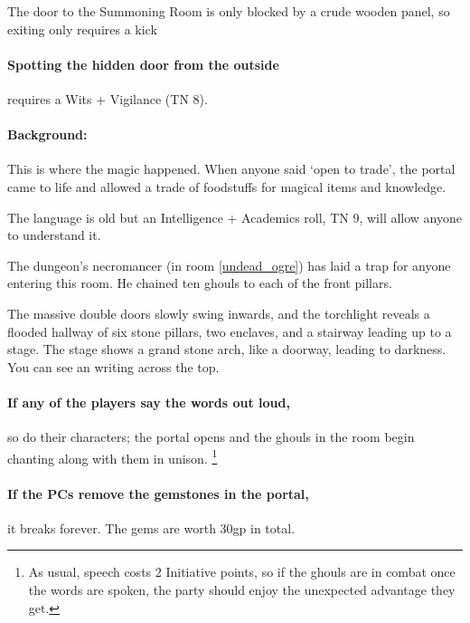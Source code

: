 \begin{multicols}{2}
The door to the Summoning Room is only blocked by a crude wooden panel, so exiting only requires a kick

\paragraph{Spotting the hidden door from the outside}
requires a Wits + Vigilance (TN 8).

\label{summoningRoom}

\paragraph{Background:}
This is where the magic happened.
When anyone said `open to trade', the portal came to life and allowed a trade of foodstuffs for magical items and knowledge.

The language is old but an Intelligence + Academics roll, TN 9, will allow anyone to understand it.

The dungeon's necromancer (in room \ref{undead_ogre}) has laid a trap for anyone entering this room.
He chained ten ghouls to each of the front pillars.


\begin{boxtext}

  The massive double doors slowly swing inwards, and the torchlight reveals a flooded hallway of six stone pillars, two enclaves, and a stairway leading up to a stage.
  The stage shows a grand stone arch, like a doorway, leading to darkness.
  You can see an writing across the top.

\end{boxtext}

\paragraph{If any of the players say the words out loud,}
so do their characters; the portal opens and the ghouls in the room begin chanting along with them in unison.%
\footnote{As usual, speech costs 2 Initiative points, so if the ghouls are in combat once the words are spoken, the party should enjoy the unexpected advantage they get.}

\paragraph{If the PCs remove the gemstones in the portal,}
it breaks forever.
The gems are worth 30gp in total.


\end{multicols}
